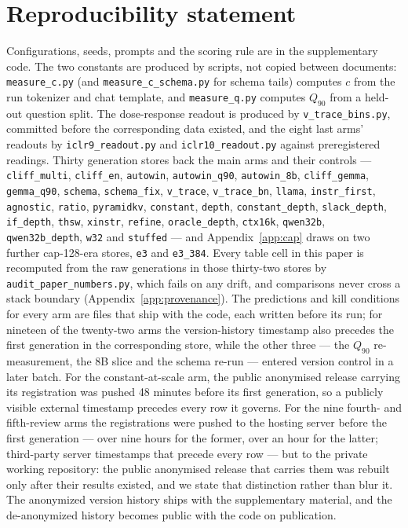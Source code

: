 \documentclass{article}
\begin{document}
\section*{Reproducibility statement}
Configurations, seeds, prompts and the scoring rule are in the
supplementary code. The two constants are produced by scripts, not copied
between documents: \texttt{measure\_c.py} (and
\texttt{measure\_c\_schema.py} for schema tails) computes $c$ from the
run tokenizer and chat template, and \texttt{measure\_q.py} computes
$Q_{90}$ from a held-out question split. The dose-response readout is
produced by \texttt{v\_trace\_bins.py}, committed before the
corresponding data existed, and the eight last arms' readouts by
\texttt{iclr9\_readout.py} and \texttt{iclr10\_readout.py} against
preregistered readings.
Thirty generation stores back the main arms
and their controls --- \texttt{cliff\_multi}, \texttt{cliff\_en},
\texttt{autowin}, \texttt{autowin\_q90}, \texttt{autowin\_8b},
\texttt{cliff\_gemma}, \texttt{gemma\_q90}, \texttt{schema},
\texttt{schema\_fix}, \texttt{v\_trace}, \texttt{v\_trace\_bn},
\texttt{llama}, \texttt{instr\_first}, \texttt{agnostic},
\texttt{ratio}, \texttt{pyramidkv}, \texttt{constant},
\texttt{depth}, \texttt{constant\_depth}, \texttt{slack\_depth},
\texttt{if\_depth}, \texttt{thsw}, \texttt{xinstr},
\texttt{refine}, \texttt{oracle\_depth}, \texttt{ctx16k},
\texttt{qwen32b}, \texttt{qwen32b\_depth}, \texttt{w32} and
\texttt{stuffed} --- and
Appendix~\ref{app:cap} draws on two further cap-128-era stores,
\texttt{e3} and \texttt{e3\_384}. Every table cell in this paper is
recomputed from the raw generations in those thirty-two stores
by \texttt{audit\_paper\_numbers.py}, which fails on any drift, and
comparisons never cross a stack boundary
(Appendix~\ref{app:provenance}). The predictions and kill
conditions for every arm are files that ship with the code, each written
before its run; for nineteen of the twenty-two arms the version-history timestamp
also precedes the first generation in the corresponding store, while the
other three --- the $Q_{90}$ re-measurement, the 8B slice and the schema
re-run --- entered version control in a later batch. For the
constant-at-scale arm, the public anonymised release carrying its
registration was pushed 48 minutes before its first generation, so a
publicly visible external timestamp precedes every row it governs. For
the nine fourth- and fifth-review arms the registrations were pushed
to the hosting server before the first generation --- over nine hours
for the former, over an hour for the latter; third-party server
timestamps that precede every row --- but to the
private working repository: the public anonymised release that carries
them was rebuilt only after their results existed, and we state that
distinction rather than blur it. The
anonymized version history ships with the supplementary material, and the
de-anonymized history becomes public with the code on publication.
\end{document}
